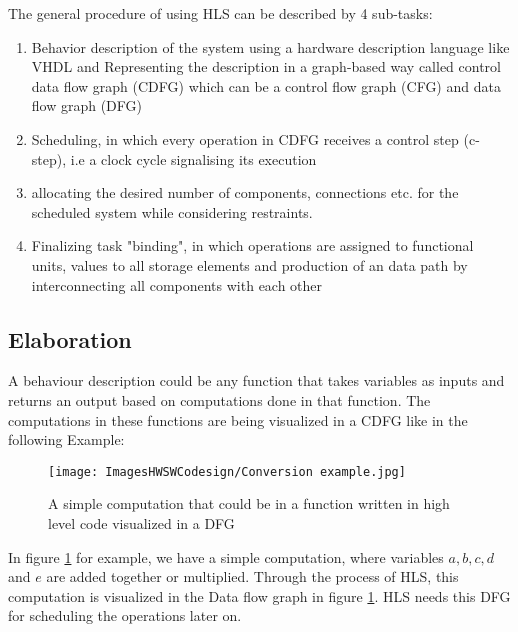 \documentclass[conference]{IEEEtran}
\begin{document}
The general procedure of using HLS can be described by 4 sub-tasks\cite{EfficientListBased}:
\begin{enumerate}
    \item Behavior description of the system using a hardware description language like VHDL and Representing the description in a graph-based way called control data flow graph (CDFG) which can be a control flow graph (CFG) and data flow graph (DFG)\cite{ElectronicDesignAutomation}\cite{EfficientListBased}
    \item Scheduling, in which every operation in CDFG receives a control step (c-step), i.e a clock cycle signalising its execution\cite{EfficientListBased}
    \item allocating the desired number of components, connections etc. for the scheduled system while considering restraints.\cite{EfficientListBased}
    \item Finalizing task "binding", in which operations are assigned to functional units, values to all storage elements and production of an data path by interconnecting all components with each other\cite{EfficientListBased}\\
\end{enumerate}

\subsection{Elaboration}

A behaviour description could be any function that takes variables as inputs and returns an output based on computations done in that function\cite{ElectronicDesignAutomation}. The computations in these functions are being visualized in a CDFG like in the following Example:

\begin{figure}[htbp]
    \centering
    \texttt{[image: ImagesHWSWCodesign/Conversion example.jpg]}
    \caption{A simple computation that could be in a function written in high level code visualized in a DFG}
    \label{fig:DFGConversionExample}
\end{figure}

In figure \ref{fig:DFGConversionExample} for example, we have a simple computation, where variables $a, b, c, d$ and $e$ are added together or multiplied. Through the process of HLS, this computation is visualized in the Data flow graph in figure \ref{fig:DFGConversionExample}. HLS needs this DFG for scheduling the operations later on.\\
\end{document}
